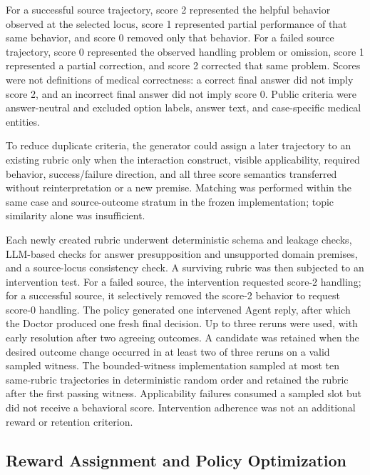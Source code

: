 For a successful source trajectory, score 2 represented the helpful behavior
observed at the selected locus, score 1 represented partial performance of that
same behavior, and score 0 removed only that behavior.  For a failed source
trajectory, score 0 represented the observed handling problem or omission,
score 1 represented a partial correction, and score 2 corrected that same
problem.  Scores were not definitions of medical correctness: a correct final
answer did not imply score 2, and an incorrect final answer did not imply score
0.  Public criteria were answer-neutral and excluded option labels, answer
text, and case-specific medical entities.

To reduce duplicate criteria, the generator could assign a later trajectory to
an existing rubric only when the interaction construct, visible applicability,
required behavior, success/failure direction, and all three score semantics
transferred without reinterpretation or a new premise.  Matching was performed
within the same case and source-outcome stratum in the frozen implementation;
topic similarity alone was insufficient.

Each newly created rubric underwent deterministic schema and leakage checks,
LLM-based checks for answer presupposition and unsupported domain premises, and
a source-locus consistency check.  A surviving rubric was then subjected to an
intervention test.  For a failed source, the intervention requested score-2
handling; for a successful source, it selectively removed the score-2 behavior
to request score-0 handling.  The policy generated one intervened Agent reply,
after which the Doctor produced one fresh final decision.  Up to three reruns
were used, with early resolution after two agreeing outcomes.  A candidate was
retained when the desired outcome change occurred in at least two of three
reruns on a valid sampled witness.  The bounded-witness implementation sampled
at most ten same-rubric trajectories in deterministic random order and retained
the rubric after the first passing witness.  Applicability failures consumed a
sampled slot but did not receive a behavioral score.  Intervention adherence
was not an additional reward or retention criterion.

\subsection{Reward Assignment and Policy Optimization}

